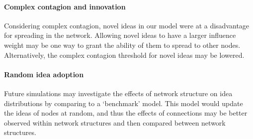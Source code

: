 \paragraph{Complex contagion and innovation}
Considering complex contagion, novel ideas in our model were at a disadvantage for spreading in the network. Allowing novel ideas to have a larger influence weight may be one way to grant the ability of them to spread to other nodes. Alternatively, the complex contagion threshold for novel ideas may be lowered.

\paragraph{Random idea adoption}
Future simulations may investigate the effects of network structure on idea distributions by comparing to a `benchmark' model. This model would update the ideas of nodes at random, and thus the effects of connections may be better observed within network structures and then compared between network structures.



